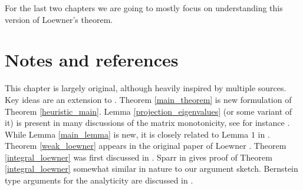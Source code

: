 For the last two chapters we are going to mostly focus on understanding this version of Loewner's theorem.

\section{Notes and references}

This chapter is largely original, although heavily inspired by multiple sources. Key ideas are an extension to \cite{Heina}. Theorem \ref{main_theorem} is new formulation of Theorem \ref{heuristic_main}. Lemma \ref{projection_eigenvalues} (or some variant of it) is present in many discussions of the matrix monotonicity, see for instance \cite{Don}. While Lemma \ref{main_lemma} is new, it is closely related to Lemma $1$ in \cite{Sparr}. Theorem \ref{weak_loewner} appears in the original paper of Loewner \cite{Low}. Theorem \ref{integral_loewner} was first discussed in \cite{Ben}. Sparr in \cite{Sparr} gives proof of Theorem \ref{integral_loewner} somewhat similar in nature to our argument sketch. Bernstein type arguments for the analyticity are discussed in \cite{Ben}.
